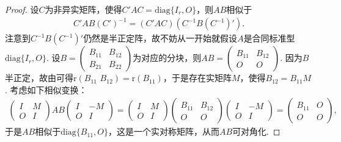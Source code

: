 \documentclass[../../main.tex]{subfiles}
\begin{document}
\begin{proof}
设\(C\)为非异实矩阵，使得\(C'AC = \mathrm{diag}\{I_r,O\}\)，则\(AB\)相似于
\begin{align*}
C'AB(C')^{-1}=(C'AC)(C^{-1}B(C^{-1})').
\end{align*}
注意到\(C^{-1}B(C^{-1})'\)仍然是半正定阵，故不妨从一开始就假设\(A\)是合同标准型\(\mathrm{diag}\{I_r,O\}\). 设\(B=\begin{pmatrix}B_{11}&B_{12}\\B_{21}&B_{22}\end{pmatrix}\)为对应的分块，则\(AB=\begin{pmatrix}B_{11}&B_{12}\\O&O\end{pmatrix}\). 因为\(B\)半正定，故由可得\(\mathrm{r}(B_{11}\,\,B_{12})=\mathrm{r}(B_{11})\)，于是存在实矩阵\(M\)，使得\(B_{12}=B_{11}M\). 考虑如下相似变换：
\begin{align*}
\begin{pmatrix}I&M\\O&I\end{pmatrix}AB\begin{pmatrix}I&-M\\O&I\end{pmatrix}=\begin{pmatrix}I&M\\O&I\end{pmatrix}\begin{pmatrix}B_{11}&B_{12}\\O&O\end{pmatrix}\begin{pmatrix}I&-M\\O&I\end{pmatrix}=\begin{pmatrix}B_{11}&O\\O&O\end{pmatrix},
\end{align*}
于是\(AB\)相似于\(\mathrm{diag}\{B_{11},O\}\)，这是一个实对称矩阵，从而\(AB\)可对角化.

\end{proof}
\end{document}
